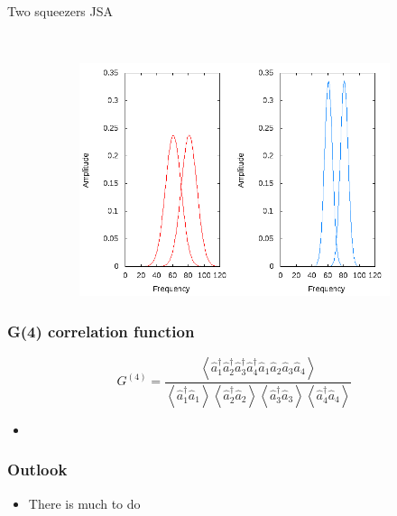 \documentclass{beamer}
\renewcommand{\annia}{\hat{a}}
\renewcommand{\creata}{\hat{a}^\dagger}
\begin{document}
\begin{frame}{Two  squeezers JSA} 
    \begin{figure}
        \centering
        \begin{subfigure}{0.45\textwidth}
        \end{subfigure}
        ~
        \begin{subfigure}{0.45\textwidth}
        \includegraphics[width=1\textwidth]{single_sig_idler12.png}
    \end{subfigure}
   \end{figure}

\end{frame} 

\begin{frame}
    \frametitle{G(4) correlation function}
    \begin{equation}
        G^{(4)} = \frac{ \left< \creata_1 \creata_2 \creata_3 \creata_4 \annia_1 \annia_2 \annia_3 \annia_4 \right>}
        {\left< \creata_1 \annia_1 \right> \left< \creata_2 \annia_2 \right> \left< \creata_3 \annia_3 \right> \left< \creata_4 \annia_4 \right>}
    \end{equation}
  
    \begin{figure}[h]
    \end{figure}
    \begin{itemize}
	\item   
\end{itemize}
\end{frame}

\begin{frame}
\frametitle{Outlook}
\begin{itemize}
    \item There is much to do
\end{itemize}
\end{frame}



\end{document}

